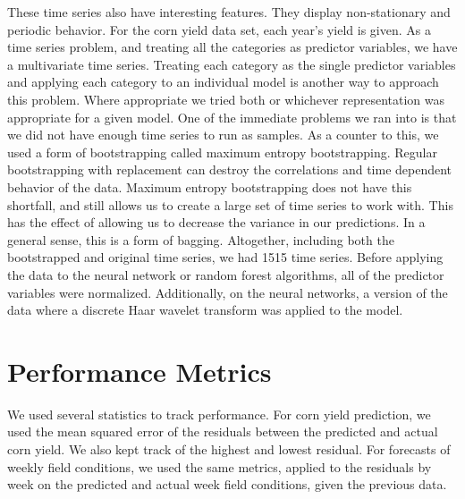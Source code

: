 \documentclass[a4paper]{apa6}
\begin{document}
These time series also have interesting features. They display non-stationary and periodic behavior. For the corn yield data set, each year’s yield is given. As a time series problem, and treating all the categories as predictor variables, we have a multivariate time series.  Treating each category as the single predictor variables and applying each category to an individual model is another way to approach this problem. Where appropriate we tried both or whichever representation was appropriate for a given model.
One of the immediate problems we ran into is that we did not have enough time series to run as samples. As a counter to this, we used a form of bootstrapping called maximum entropy bootstrapping. Regular bootstrapping with replacement can destroy the correlations and time dependent behavior of the data. Maximum entropy bootstrapping does not have this shortfall, and still allows us to create a large set of time series to work with. This has the effect of allowing us to decrease the variance in our predictions. In a general sense, this is a form of bagging. Altogether, including both the bootstrapped and original time series, we had 1515 time series. Before applying the data to the neural network or random forest algorithms, all of the predictor variables were normalized. Additionally, on the neural networks, a version of the data where a discrete Haar wavelet transform was applied to the model. 

\section*{Performance Metrics}
We used several statistics to track performance. For corn yield prediction, we used the mean squared error of the residuals between the predicted and actual corn yield. We also kept track of the highest and lowest residual. For forecasts of weekly field conditions, we used the same metrics, applied to the residuals by week on the predicted and actual week field conditions, given the previous data. 
\end{document}
